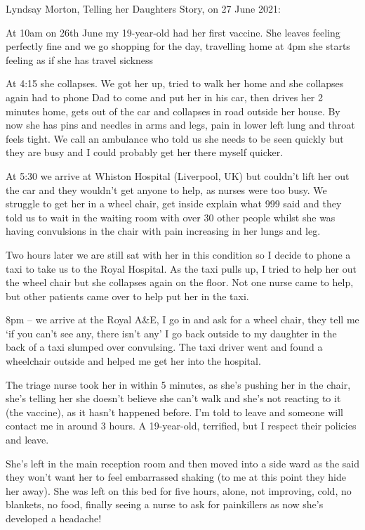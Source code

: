 Lyndsay Morton, Telling her Daughters Story, on 27 June 2021:

At 10am on 26th June my 19-year-old had her first vaccine. She leaves feeling
perfectly fine and we go shopping for the day, travelling home at 4pm she starts
feeling as if she has travel sickness

At 4:15 she collapses. We got her up, tried to walk her home and she collapses
again had to phone Dad to come and put her in his car, then drives her 2 minutes
home, gets out of the car and collapses in road outside her house. By now she
has pins and needles in arms and legs, pain in lower left lung and throat feels
tight. We call an ambulance who told us she needs to be seen quickly but they
are busy and I could probably get her there myself quicker.

At 5:30 we arrive at Whiston Hospital (Liverpool, UK) but couldn’t lift her out
the car and they wouldn’t get anyone to help, as nurses were too busy. We
struggle to get her in a wheel chair, get inside explain what 999 said and they
told us to wait in the waiting room with over 30 other people whilst she was
having convulsions in the chair with pain increasing in her lungs and leg.

Two hours later we are still sat with her in this condition so I decide to phone
a taxi to take us to the Royal Hospital. As the taxi pulls up, I tried to help
her out the wheel chair but she collapses again on the floor. Not one nurse came
to help, but other patients came over to help put her in the taxi.

8pm – we arrive at the Royal A\&E, I go in and ask for a wheel chair, they tell
me ‘if you can’t see any, there isn’t any’ I go back outside to my daughter in
the back of a taxi slumped over convulsing. The taxi driver went and found a
wheelchair outside and helped me get her into the hospital.

The triage nurse took her in within 5 minutes, as she’s pushing her in the
chair, she’s telling her she doesn’t believe she can’t walk and she’s not
reacting to it (the vaccine), as it hasn’t happened before. I’m told to leave
and someone will contact me in around 3 hours. A 19-year-old, terrified, but I
respect their policies and leave.

She’s left in the main reception room and then moved into a side ward as the
said they won’t want her to feel embarrassed shaking (to me at this point they
hide her away). She was left on this bed for five hours, alone, not improving,
cold, no blankets, no food, finally seeing a nurse to ask for painkillers as now
she’s developed a headache!

